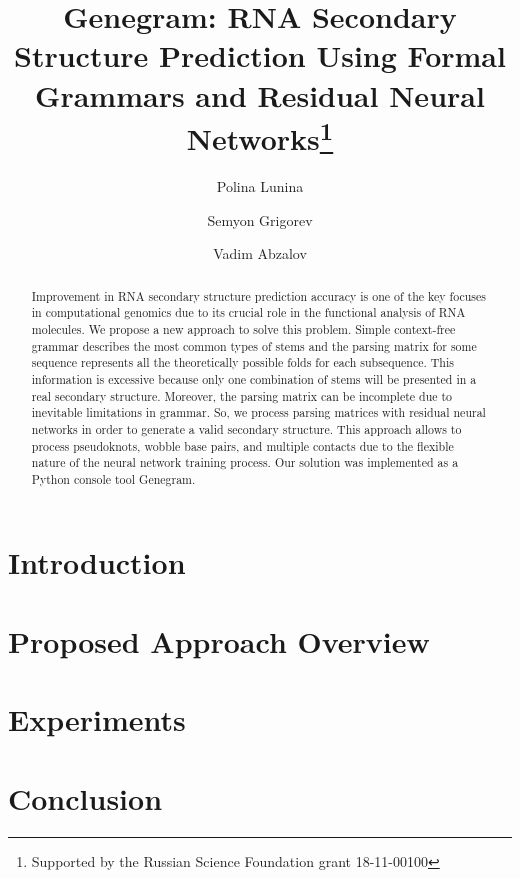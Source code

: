 \documentclass[runningheads]{llncs}
\begin{document}
%
\title{Genegram: RNA Secondary Structure Prediction Using Formal Grammars and Residual Neural Networks\thanks{Supported by the Russian Science Foundation grant 18-11-00100}}
%
%
\author{Polina Lunina \Letter \and
Semyon Grigorev \and
Vadim Abzalov}
%
%
%
\maketitle             %
%
\begin{abstract}
Improvement in RNA secondary structure prediction accuracy is one of the key focuses in computational genomics due to its crucial role in the functional analysis of RNA molecules. We propose a new approach to solve this problem. Simple context-free grammar describes the most common types of stems and the parsing matrix for some sequence represents all the theoretically possible folds for each subsequence. This information is excessive because only one combination of stems will be presented in a real secondary structure. Moreover, the parsing matrix can be incomplete due to inevitable limitations in grammar. So, we process parsing matrices with residual neural networks in order to generate a valid secondary structure. This approach allows to process pseudoknots, wobble base pairs, and multiple contacts due to the flexible nature of the neural network training process. Our solution was implemented as a Python console tool Genegram.

\end{abstract}
%
%
%
\section{Introduction}


\section{Proposed Approach Overview}


\section{Experiments}


\section{Conclusion}


%
 

\end{document}
